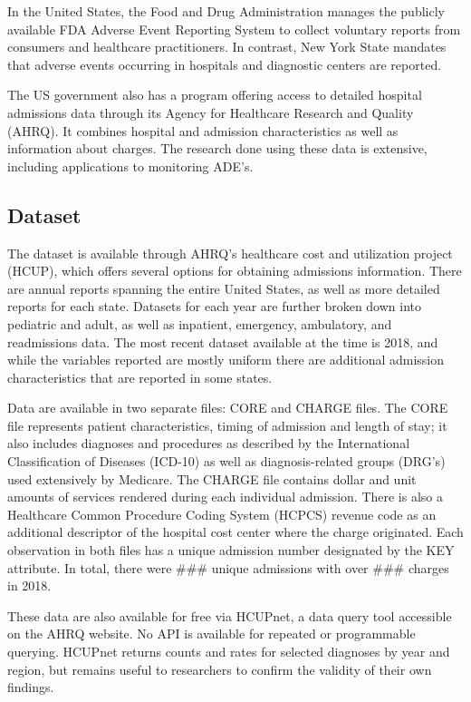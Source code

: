 \documentclass[preprint, 3p,
authoryear]{elsarticle} %
\begin{document}
In the United States, the Food and Drug Administration manages the
publicly available FDA Adverse Event Reporting System to collect
voluntary reports from consumers and healthcare practitioners. In
contrast, New York State mandates that adverse events occurring in
hospitals and diagnostic centers are reported.

The US government also has a program offering access to detailed
hospital admissions data through its Agency for Healthcare Research and
Quality (AHRQ). It combines hospital and admission characteristics as
well as information about charges. The research done using these data is
extensive, including applications to monitoring ADE's.

\hypertarget{dataset}{%
\subsection{Dataset}\label{dataset}}

The dataset is available through AHRQ's healthcare cost and utilization
project (HCUP), which offers several options for obtaining admissions
information. There are annual reports spanning the entire United States,
as well as more detailed reports for each state. Datasets for each year
are further broken down into pediatric and adult, as well as inpatient,
emergency, ambulatory, and readmissions data. The most recent dataset
available at the time is 2018, and while the variables reported are
mostly uniform there are additional admission characteristics that are
reported in some states.

Data are available in two separate files: CORE and CHARGE files. The
CORE file represents patient characteristics, timing of admission and
length of stay; it also includes diagnoses and procedures as described
by the International Classification of Diseases (ICD-10) as well as
diagnosis-related groups (DRG's) used extensively by Medicare. The
CHARGE file contains dollar and unit amounts of services rendered during
each individual admission. There is also a Healthcare Common Procedure
Coding System (HCPCS) revenue code as an additional descriptor of the
hospital cost center where the charge originated. Each observation in
both files has a unique admission number designated by the KEY
attribute. In total, there were \#\#\# unique admissions with over
\#\#\# charges in 2018.

These data are also available for free via HCUPnet, a data query tool
accessible on the AHRQ website. No API is available for repeated or
programmable querying. HCUPnet returns counts and rates for selected
diagnoses by year and region, but remains useful to researchers to
confirm the validity of their own findings.
\end{document}
